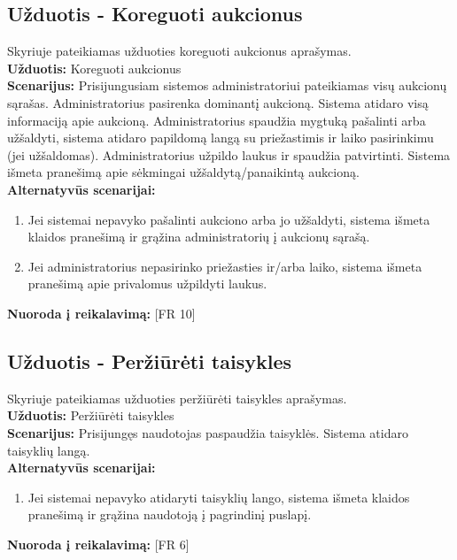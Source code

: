 \documentclass{VUMIFPSkursinis}
\begin{document}
	\subsection{Užduotis - Koreguoti aukcionus}
	Skyriuje pateikiamas užduoties koreguoti aukcionus aprašymas.\\
	\textbf{Užduotis:}  Koreguoti aukcionus \\
	\textbf{Scenarijus:} Prisijungusiam sistemos administratoriui pateikiamas visų aukcionų sąrašas. Administratorius pasirenka dominantį aukcioną. Sistema atidaro visą informaciją apie aukcioną. Administratorius spaudžia mygtuką pašalinti arba užšaldyti, sistema atidaro papildomą langą su priežastimis ir laiko pasirinkimu (jei užšaldomas). Administratorius užpildo laukus ir spaudžia patvirtinti. Sistema išmeta pranešimą apie sėkmingai užšaldytą/panaikintą aukcioną.\\
	\textbf{Alternatyvūs scenarijai:}
	\begin{enumerate}
		\item Jei sistemai nepavyko pašalinti aukciono arba jo užšaldyti, sistema išmeta klaidos pranešimą ir grąžina administratorių į aukcionų sąrašą.
		\item Jei administratorius nepasirinko priežasties ir/arba laiko, sistema išmeta pranešimą apie privalomus užpildyti laukus.
	\end{enumerate}
	\textbf{Nuoroda į reikalavimą: } [FR 10]

	\subsection{Užduotis - Peržiūrėti taisykles}
	Skyriuje pateikiamas užduoties peržiūrėti taisykles aprašymas.\\
	\textbf{Užduotis:}  Peržiūrėti taisykles \\
	\textbf{Scenarijus:}  Prisijungęs naudotojas paspaudžia taisyklės. Sistema atidaro taisyklių langą. \\
	\textbf{Alternatyvūs scenarijai:}
	\begin{enumerate}
		\item Jei sistemai nepavyko atidaryti taisyklių lango, sistema išmeta klaidos pranešimą ir grąžina naudotoją į pagrindinį puslapį.
	\end{enumerate}
	\textbf{Nuoroda į reikalavimą: } [FR 6]
\end{document}
